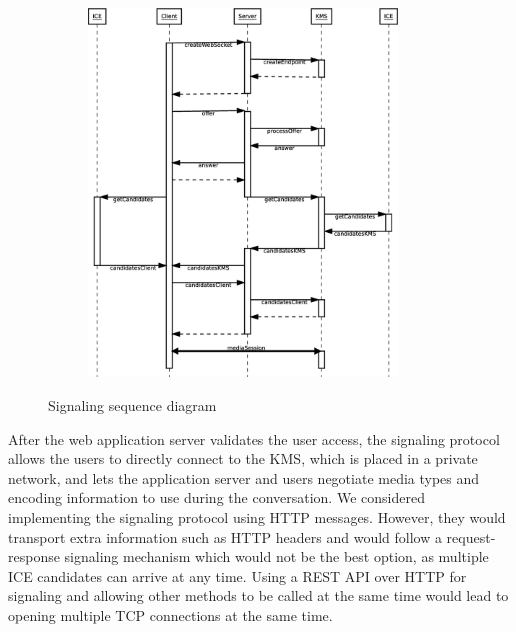 \begin{figure}
    \centering
    \begin{subfigure}{}
    	\includegraphics[width=0.9\textwidth]{figures/signaling}
    \end{subfigure}
    \caption{Signaling sequence diagram}
    \label{fig:signaling2}
\end{figure} 



After the web application server validates the user access, the signaling protocol allows the users to directly connect to the \ac{KMS}, which is placed in a private network, and lets the application server and users negotiate media types and encoding information to use during the conversation.
We considered implementing the signaling protocol using \ac{HTTP} messages.
However, they would transport extra information such as \ac{HTTP} headers and would follow a request-response signaling mechanism which would not be the best option, as multiple ICE candidates can arrive at any time. Using a \ac{REST} \ac{API} over \ac{HTTP} for signaling and allowing other methods to be called at the same time would lead to opening multiple \ac{TCP} connections at the same time.

